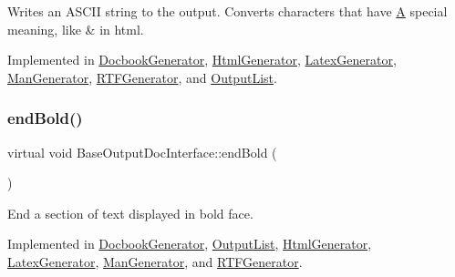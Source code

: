 Writes an A\+S\+C\+II string to the output. Converts characters that have \mbox{\hyperlink{class_a}{A}} special meaning, like {\ttfamily \&} in html. 

Implemented in \mbox{\hyperlink{class_docbook_generator_a78cc7c7199538d0f38d2696443ca71bf}{Docbook\+Generator}}, \mbox{\hyperlink{class_html_generator_a1f33982a4ce6eac13224197e91f057d8}{Html\+Generator}}, \mbox{\hyperlink{class_latex_generator_ad6786a95e819d8af4dbfa717207cc674}{Latex\+Generator}}, \mbox{\hyperlink{class_man_generator_aae62a687e228c0f3c5b698570c603022}{Man\+Generator}}, \mbox{\hyperlink{class_r_t_f_generator_a0e292cd3d60599a4ddfad4036c0b6d46}{R\+T\+F\+Generator}}, and \mbox{\hyperlink{class_output_list_a3335d926bd59e1c9e3912c4352ca5bc6}{Output\+List}}.

\mbox{\label{class_base_output_doc_interface_a2a17911ba778f8efac83999fb5d190d9}} 
\subsubsection{\texorpdfstring{endBold()}{endBold()}}
{\footnotesize\ttfamily virtual void Base\+Output\+Doc\+Interface\+::end\+Bold (\begin{DoxyParamCaption}{ }\end{DoxyParamCaption})\hspace{0.3cm}{\ttfamily [pure virtual]}}

End a section of text displayed in bold face. 

Implemented in \mbox{\hyperlink{class_docbook_generator_a798fe205e0beedacd6c035c865ae354c}{Docbook\+Generator}}, \mbox{\hyperlink{class_output_list_aa3f855a4e60d2a7c6769b66d43c69b23}{Output\+List}}, \mbox{\hyperlink{class_html_generator_a8e60c605c5db7577e2e0256c0431dcb1}{Html\+Generator}}, \mbox{\hyperlink{class_latex_generator_ae2336bd8bc8ca0802fb94ff6953e7779}{Latex\+Generator}}, \mbox{\hyperlink{class_man_generator_acc9e3c928bd473ce079e323f19948dc7}{Man\+Generator}}, and \mbox{\hyperlink{class_r_t_f_generator_a430a7df863505527d0b1da4c70116a05}{R\+T\+F\+Generator}}.

\mbox{\label{class_base_output_doc_interface_a08f032482a8f23ac1aab66552db43a81}} 
